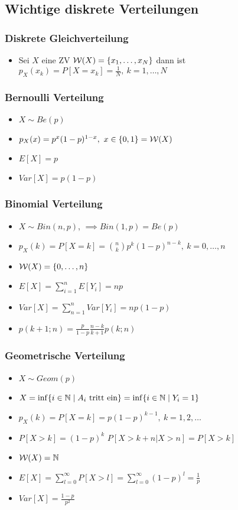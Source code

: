 \subsection{Wichtige diskrete Verteilungen}
\subsubsection{Diskrete Gleichverteilung}
\begin{itemize}
    \item Sei $X$ eine ZV $\mathcal{W}(X) = \{x_1, \dots, x_N\}$ dann ist $p_X(x_k) = P[X = x_k] = \frac{1}{N}, \ k = 1,\dots, N$
\end{itemize}

\subsubsection{Bernoulli Verteilung}
\begin{itemize}
    \item $X \sim Be(p)$
    \item $p_X(x) = p^x(1-p)^{1-x}, \ x \in \{0,1\} = \mathcal{W}(X)$
    \item $E[X] = p$
    \item $Var[X] = p(1 - p)$
\end{itemize}

\subsubsection{Binomial Verteilung}
\begin{itemize}
    \item $X \sim Bin(n, p)$, $\implies Bin(1, p) = Be(p)$
    \item $p_X(k) = P[X = k] = {n\choose k} p^k (1 - p)^{n - k}, \ k = 0, \dots, n$
    \item $\mathcal{W}(X) = \{0, \dots, n\}$
    \item $E[X] = \sum_{i=1}^{n} E[Y_i] = np$
    \item $Var[X] = \sum_{n=1}^{n} Var[Y_i] = np(1 - p)$
    \item $p(k + 1; n) = \frac{p}{1 - p}\frac{n - k}{k + 1} p(k; n)$
\end{itemize}

\subsubsection{Geometrische Verteilung}
\begin{itemize}
    \item $X \sim Geom(p)$
    \item $X = \inf \{i \in \mathbb{N} \mid A_i \text{ tritt ein}\} = \inf \{i \in \mathbb{N} \mid Y_i = 1\}$
    \item $p_X(k) = P[X = k] = p(1 - p)^{k - 1}, \ k = 1, 2, \dots$
    \item $P[X > k] = (1 - p)^k$
     $P[X > k + n | X > n] = P[X > k]$
    \item $\mathcal{W}(X) = \mathbb{N}$
    \item $E[X] = \sum_{l=0}^{\infty} P[X > l] = \sum_{l=0}^{\infty} (1 - p)^l = \frac{1}{p}$
    \item $Var[X] = \frac{1 - p}{p^2}$
\end{itemize}

